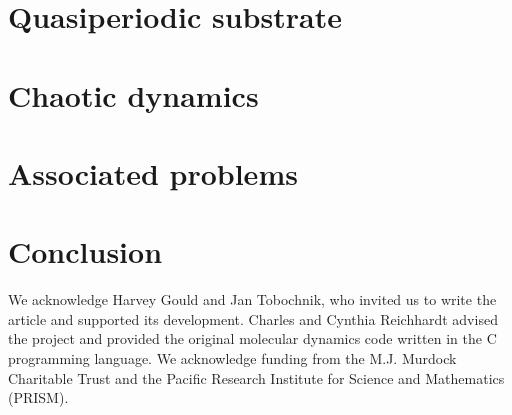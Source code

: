 \documentclass[prb,preprint]{revtex4}
\begin{document}
\section{Quasiperiodic substrate}
\label{sec:quasiperiod}	%

\section{Chaotic dynamics}
\label{sec:chaos}	%

\section{Associated problems}
\label{sec:problems}	%


\section{Conclusion}
\label{sec:conclusion}	%


\begin{acknowledgments}

  We acknowledge Harvey Gould and Jan Tobochnik,
  who invited us to write the article and
  supported its development.
  Charles and Cynthia Reichhardt advised 
  the project and provided the original molecular dynamics code
  written in the C programming language.
  We acknowledge funding from the M.J. Murdock Charitable Trust
  and the Pacific Research Institute for Science and Mathematics (PRISM).

\end{acknowledgments}
\end{document}
